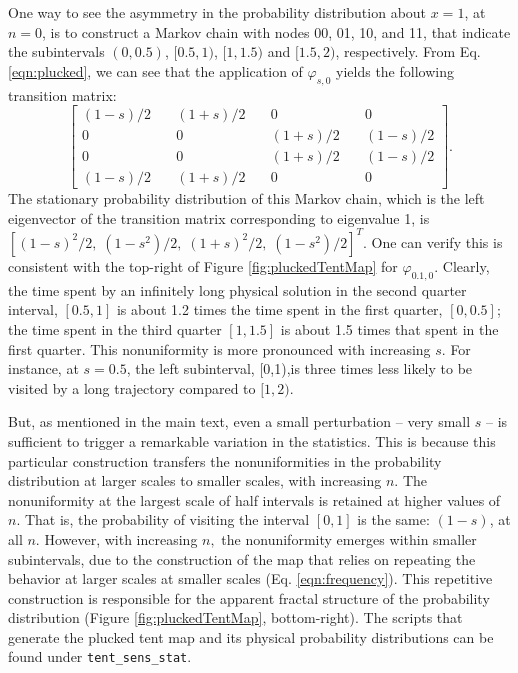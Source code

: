 \documentclass[preprint,12pt]{elsarticle}
\begin{document}
One way to see the asymmetry in the probability distribution 
about $x=1$, at $n=0$, is to construct a Markov chain with nodes 00, 01, 10, and 11, that indicate the subintervals $(0,0.5)$, $[0.5,1)$, 
$[1,1.5)$ and $[1.5,2)$, respectively. From Eq. \ref{eqn:plucked}, we can see that the application of $\varphi_{s,0}$ yields the following transition matrix:
\[
\begin{bmatrix}
		(1-s)/2\quad & (1+s)/2 \quad & 0 \quad & 0 \\
		0 \quad & 0 \quad & (1+s)/2 \quad & (1-s)/2 \\
		0 \quad & 0  \quad & (1+s)/2 \quad & (1-s)/2 \\
		(1-s)/2 \quad & (1+s)/2 \quad & 0 \quad & 0
\end{bmatrix}
.\] 
The stationary probability distribution of this Markov chain, which 
is the left eigenvector of the transition matrix corresponding to eigenvalue 1, is $[(1-s)^2/2, \; (1-s^2)/2, \; (1+s)^2/2,\; (1-s^2)/2]^T$.
One can verify this is consistent with the top-right of Figure \ref{fig:pluckedTentMap} for $\varphi_{0.1,0}$. Clearly, the time spent by an infinitely long physical solution in the second quarter interval, $[0.5,1]$ is about 1.2 times the time spent in the first quarter, $[0,0.5]$; the time spent in the third quarter $[1,1.5]$ is about 1.5 times that spent in the first quarter. This nonuniformity is more pronounced with increasing $s$. For instance, at $s=0.5$, the left subinterval, [0,1),is three times less likely to be visited by a long trajectory compared to $[1,2)$. 

But, as mentioned in the main text, even a small perturbation -- very small $s$ -- is sufficient to trigger a remarkable variation in the statistics. This is because this particular construction transfers 
the nonuniformities in the probability distribution at larger scales to smaller scales, with increasing $n.$ The nonuniformity at the largest 
scale of half intervals is retained at higher values of $n.$ That is,
the probability of visiting the interval $[0,1]$ is the same: $(1-s)$, at all $n$. However, with increasing $n,$ the nonuniformity emerges within smaller subintervals, due to the construction of the map that relies on repeating the behavior at larger scales at smaller scales (Eq. \ref{eqn:frequency}). This repetitive construction is responsible for the apparent fractal structure of the probability distribution (Figure \ref{fig:pluckedTentMap}, bottom-right). The scripts that generate the plucked tent map and its 
physical probability distributions can be found under \verb+tent_sens_stat+. 
\end{document}
